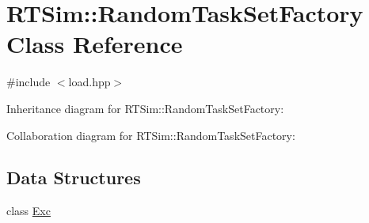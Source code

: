 \hypertarget{classRTSim_1_1RandomTaskSetFactory}{}\section{R\+T\+Sim\+:\+:Random\+Task\+Set\+Factory Class Reference}
\label{classRTSim_1_1RandomTaskSetFactory}


{\ttfamily \#include $<$load.\+hpp$>$}



Inheritance diagram for R\+T\+Sim\+:\+:Random\+Task\+Set\+Factory\+:


Collaboration diagram for R\+T\+Sim\+:\+:Random\+Task\+Set\+Factory\+:
\subsection*{Data Structures}
\begin{DoxyCompactItemize}
\item 
class \hyperlink{classRTSim_1_1RandomTaskSetFactory_1_1Exc}{Exc}
\end{DoxyCompactItemize}
